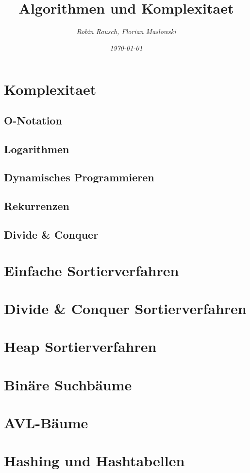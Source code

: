 \documentclass[12pt,a4paper]{article}
\author{\slshape Robin Rausch, Florian Maslowski}
\title{Algorithmen und Komplexitaet}
\date{\slshape \today}
\begin{document}
\maketitle
\tableofcontents
\newpage
\section{Komplexitaet}

\subsection{O-Notation}

\subsection{Logarithmen}

\subsection{Dynamisches Programmieren}

\subsection{Rekurrenzen}

\subsection{Divide \& Conquer}

\section{Einfache Sortierverfahren}

\section{Divide \& Conquer Sortierverfahren}

\section{Heap Sortierverfahren}

\section{Binäre Suchbäume}

\section{AVL-Bäume}

\section{Hashing und Hashtabellen}
\end{document}

